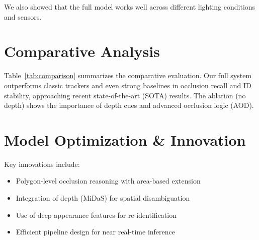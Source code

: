 \documentclass[12pt,a4paper]{report}
\theoremstyle{definition}
\theoremstyle{remark}
\begin{document}
We also showed that the full model works well across different lighting conditions and sensors.

\section{Comparative Analysis}

\begin{table}[H]
    \centering
    \caption{Comparative analysis of tracking and occlusion handling systems}
    \label{tab:comparison}
\end{table}


Table~\ref{tab:comparison} summarizes the comparative evaluation. Our full system outperforms classic trackers and even strong baselines in occlusion recall and ID stability, approaching recent state-of-the-art (SOTA) results. The ablation (no depth) shows the importance of depth cues and advanced occlusion logic (AOD).

\section{Model Optimization \& Innovation}

Key innovations include:
\begin{itemize}
    \item Polygon-level occlusion reasoning with area-based extension
    \item Integration of depth (MiDaS) for spatial disambiguation
    \item Use of deep appearance features for re-identification
    \item Efficient pipeline design for near real-time inference
\end{itemize}
\end{document}
